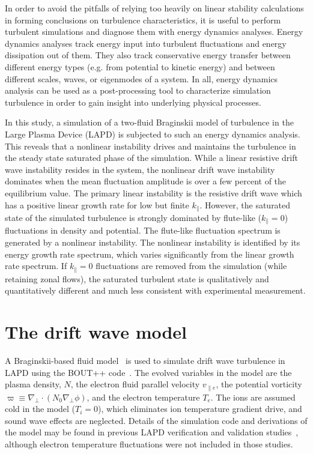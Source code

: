 \documentclass[showpacs,preprintnumbers,amsmath,amssymb,superscriptaddress,aip]{revtex4-1}
\def\grad{\nabla}
\newcommand{\gradperp}{\grad_\perp}
\newcommand{\vpe}{v_{\parallel e}}
\begin{document}
In order to avoid the pitfalls of relying too heavily on linear stability calculations in forming conclusions on turbulence characteristics, it is useful to perform turbulent simulations
and diagnose them with energy dynamics analyses. Energy dynamics analyses track energy input into turbulent fluctuations and energy dissipation out of them. 
They also track conservative energy transfer
between different energy types (e.g. from potential to kinetic energy) and between different scales, waves, or eigenmodes of a system. 
In all, energy dynamics analysis can be used as a post-processing
tool to characterize simulation turbulence in order to gain insight into underlying physical processes. 

In this study, a simulation of a
two-fluid Braginskii model of turbulence in the Large Plasma Device (LAPD) is subjected to such an energy dynamics analysis. This reveals that a nonlinear instability drives and maintains
the turbulence in the steady state saturated phase of the simulation. While a linear resistive drift wave instability resides in the system, the nonlinear drift wave instability dominates
when the mean fluctuation amplitude is over a few percent of the equilibrium value. The primary linear instability is the resistive drift wave which has a positive linear
growth rate for low but finite $k_\parallel$.  However, the saturated state of the simulated turbulence is strongly dominated by flute-like ($k_\parallel = 0$) fluctuations in density and potential.
The flute-like fluctuation spectrum is generated by a nonlinear instability.  The nonlinear instability is identified by its energy growth rate spectrum, which
varies significantly from the linear growth rate spectrum.  If $k_\parallel=0$ fluctuations are removed from the simulation (while retaining zonal flows), 
the saturated turbulent state is qualitatively and quantitatively different and much less consistent with experimental measurement.


\section{The drift wave model}
\label{dw_model}

A Braginskii-based fluid model~\cite{Braginskii1965} is used to simulate drift wave turbulence in LAPD using the BOUT++ code~\cite{dudson2009}. 
The evolved variables in the model are the plasma density, $N$, the electron fluid parallel velocity $\vpe$, the potential vorticity $\varpi \equiv \gradperp \cdot (N_0 \gradperp \phi)$,
and the electron temperature $T_e$. The ions are assumed cold in the
model ($T_i = 0$), which eliminates ion temperature gradient drive,
and sound wave effects are neglected. Details of the simulation code and derivations of the model
may be found in previous LAPD verification and validation studies~\cite{Popovich2010a,Popovich2010b,Umansky2011,friedman2012}, 
although electron temperature fluctuations were not included in those studies.
\end{document}
